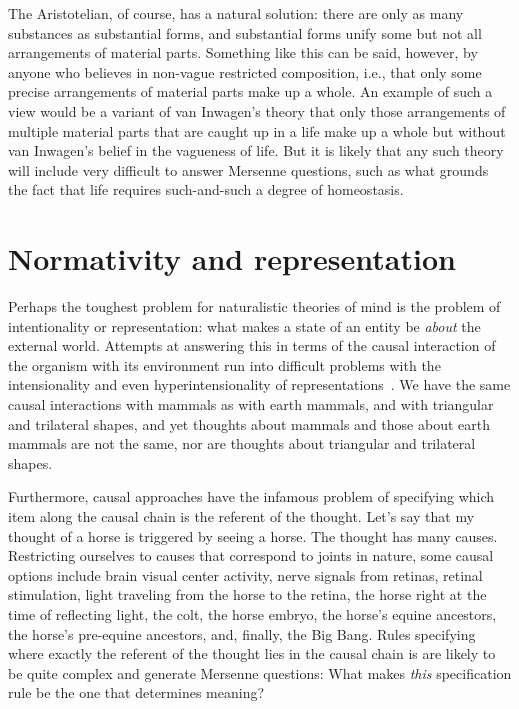 The Aristotelian, of course, has a natural solution: there are only as many substances as substantial forms, and 
substantial forms unify some but not all arrangements of material parts. Something like this can be said, however,
by anyone who believes in non-vague restricted composition, i.e., that only some precise arrangements of material parts 
make up a whole. An example of such a view would be a variant of van Inwagen's theory that only those arrangements of multiple material parts that are 
caught up in a life make up a whole but without van Inwagen's belief in the vagueness of life. 
But it is likely that any such theory will include very difficult to answer Mersenne questions, such as 
what grounds the fact that life requires such-and-such a degree of homeostasis.

\section{Normativity and representation}\label{sec:norm-repr}
Perhaps the toughest problem for naturalistic theories of mind is the problem of intentionality or representation:
what makes a state of an entity be \textit{about} the external world. Attempts at answering this in terms of the 
causal interaction of the organism with its environment run into difficult problems with the intensionality and 
even hyperintensionality of representations~\parencite[ch.~4]{Fodor1987}. We have the same causal interactions with mammals as with earth mammals,
and with triangular and trilateral shapes, and yet thoughts about mammals and those about earth mammals are not the same,
nor are thoughts about triangular and trilateral shapes. 

Furthermore, causal approaches have the infamous problem of specifying which item along the causal chain is the referent of 
the thought. Let's say that my thought of a horse is triggered by seeing a horse. The thought has many causes. 
Restricting ourselves to causes that correspond to joints in nature, some causal options include brain 
visual center activity, nerve signals from retinas, retinal stimulation, light traveling from the horse 
to the retina, the horse right at the time of reflecting light, the colt, the horse embryo, the horse's equine 
ancestors, the horse's pre-equine ancestors, and, finally, the Big Bang. Rules specifying where exactly the referent of the thought lies in the causal 
chain is are likely to be quite complex and generate Mersenne questions: What makes 
\textit{this} specification rule be the one that determines meaning?

